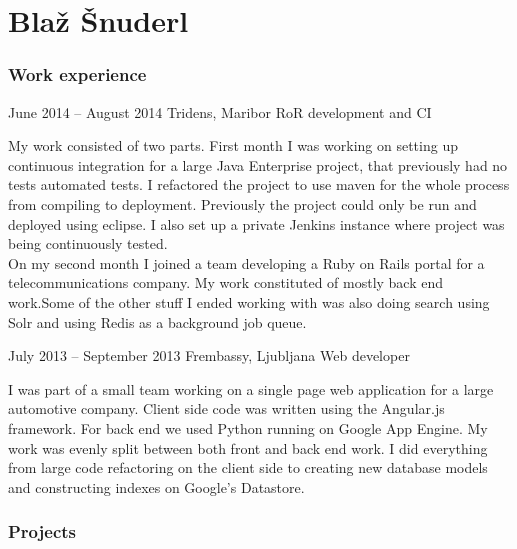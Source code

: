 \documentclass{tccv}
\begin{document}
\part{Blaž Šnuderl}

\section{Work experience}

\begin{eventlist}

\item{June 2014 -- August 2014}
     {Tridens, Maribor}
     {RoR development and CI}

My work consisted of two parts. First month I was working on setting up continuous integration for a large Java Enterprise project, that previously had no tests automated tests. I refactored the project to use maven for the whole process from compiling to deployment. Previously the project could only be run and deployed using eclipse. I also set up a private Jenkins instance where project was being continuously tested. 
\\
On my second month I joined a team developing a Ruby on Rails portal for a telecommunications company. My work constituted of mostly back end work.Some of the other stuff I ended working with was also doing search using Solr and using Redis as a background job queue.

\item{July 2013 -- September 2013}
     {Frembassy, Ljubljana}
     {Web developer}
     
I was part of a small team working on a single page web application for a large automotive company. Client side code was written using the Angular.js framework. For back end we used Python running on Google App Engine. My work was evenly split between both front and back end work. I did everything from large code refactoring on the client side to creating new database models and constructing indexes on Google's Datastore.

\end{eventlist}


\section{Projects}
\end{document}
